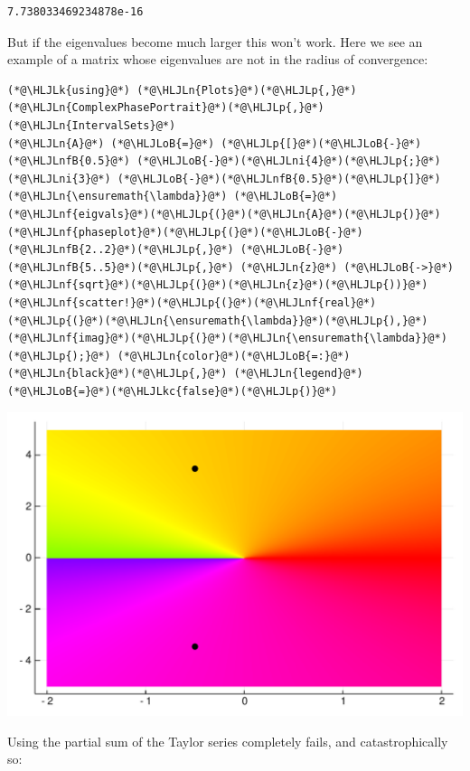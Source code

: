 \documentclass[12pt,a4paper]{article}
\newcommand{\HLJLk}[1]{\textcolor[RGB]{148,91,176}{\textbf{#1}}}
\newcommand{\HLJLkc}[1]{\textcolor[RGB]{59,151,46}{\textit{#1}}}
\newcommand{\HLJLn}[1]{#1}
\newcommand{\HLJLnf}[1]{\textcolor[RGB]{66,102,213}{#1}}
\newcommand{\HLJLnfB}[1]{\textcolor[RGB]{59,151,46}{#1}}
\newcommand{\HLJLni}[1]{\textcolor[RGB]{59,151,46}{#1}}
\newcommand{\HLJLoB}[1]{\textcolor[RGB]{102,102,102}{\textbf{#1}}}
\newcommand{\HLJLp}[1]{#1}
\begin{document}
\begin{lstlisting}
7.738033469234878e-16
\end{lstlisting}


But  if the eigenvalues become much larger this won't work. Here we see an example of a matrix whose eigenvalues are not in the  radius of convergence:


\begin{lstlisting}
(*@\HLJLk{using}@*) (*@\HLJLn{Plots}@*)(*@\HLJLp{,}@*) (*@\HLJLn{ComplexPhasePortrait}@*)(*@\HLJLp{,}@*) (*@\HLJLn{IntervalSets}@*)
(*@\HLJLn{A}@*) (*@\HLJLoB{=}@*) (*@\HLJLp{[}@*)(*@\HLJLoB{-}@*)(*@\HLJLnfB{0.5}@*) (*@\HLJLoB{-}@*)(*@\HLJLni{4}@*)(*@\HLJLp{;}@*) (*@\HLJLni{3}@*) (*@\HLJLoB{-}@*)(*@\HLJLnfB{0.5}@*)(*@\HLJLp{]}@*)
(*@\HLJLn{\ensuremath{\lambda}}@*) (*@\HLJLoB{=}@*) (*@\HLJLnf{eigvals}@*)(*@\HLJLp{(}@*)(*@\HLJLn{A}@*)(*@\HLJLp{)}@*)
(*@\HLJLnf{phaseplot}@*)(*@\HLJLp{(}@*)(*@\HLJLoB{-}@*)(*@\HLJLnfB{2..2}@*)(*@\HLJLp{,}@*) (*@\HLJLoB{-}@*)(*@\HLJLnfB{5..5}@*)(*@\HLJLp{,}@*) (*@\HLJLn{z}@*) (*@\HLJLoB{->}@*) (*@\HLJLnf{sqrt}@*)(*@\HLJLp{(}@*)(*@\HLJLn{z}@*)(*@\HLJLp{))}@*)
(*@\HLJLnf{scatter!}@*)(*@\HLJLp{(}@*)(*@\HLJLnf{real}@*)(*@\HLJLp{(}@*)(*@\HLJLn{\ensuremath{\lambda}}@*)(*@\HLJLp{),}@*)(*@\HLJLnf{imag}@*)(*@\HLJLp{(}@*)(*@\HLJLn{\ensuremath{\lambda}}@*)(*@\HLJLp{);}@*) (*@\HLJLn{color}@*)(*@\HLJLoB{=:}@*)(*@\HLJLn{black}@*)(*@\HLJLp{,}@*) (*@\HLJLn{legend}@*)(*@\HLJLoB{=}@*)(*@\HLJLkc{false}@*)(*@\HLJLp{)}@*)
\end{lstlisting}

\includegraphics[width=\linewidth]{figures/Lecture7_3_1.pdf}

Using the partial sum of the Taylor series completely fails, and catastrophically so:
\end{document}
